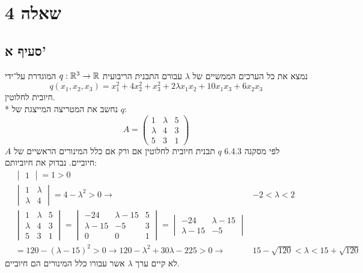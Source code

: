 \section{שאלה 4}
\subsection{סעיף א'}
נמצא את כל הערכים הממשיים של $\lambda$ עבורם התבנית הריבועית $q : \mathbb{R}^3 \to \mathbb{R}$ המוגדרת על־ידי
\[
	q(x_1, x_2, x_3) = x_1^2 + 4x_2^2 + x_3^2 + 2\lambda x_1 x_2 + 10x_1x_3 + 6x_2x_3
\]
חיובית לחלוטין. \\*
נחשב את המטריצה המייצגת של $q$:
\[
	A = \begin{pmatrix}
		1 & \lambda & 5 \\
		\lambda & 4 & 3 \\
		5 & 3 & 1
	\end{pmatrix}
\]
לפי מסקנה 6.4.3 $q$ תבנית חיובית לחלוטין אם ורק אם כלל המינורים הראשיים של $A$ חיוביים. נבדוק את חיוביותם:
\begin{align*}
	& \begin{vmatrix}
		1
	\end{vmatrix} = 1 > 0 \\
	& \begin{vmatrix}
		1 & \lambda \\
		\lambda & 4
	\end{vmatrix} = 4 - \lambda^2 > 0 \rightarrow
	& -2 < \lambda < 2 \\
	& \begin{vmatrix}
		1 & \lambda & 5 \\
		\lambda & 4 & 3 \\
		5 & 3 & 1
	\end{vmatrix}
	= \begin{vmatrix}
		-24 & \lambda - 15 & 5 \\
		\lambda - 15 & -5 & 3 \\
		0 & 0 & 1
	\end{vmatrix}
	= \begin{vmatrix}
		-24 & \lambda - 15 \\
		\lambda - 15 & -5
	\end{vmatrix} \\
	& = 120 - (\lambda - 15)^2 > 0
	\rightarrow 120 - \lambda^2 + 30 \lambda - 225 > 0
	\rightarrow & 15 - \sqrt{120} < \lambda < 15 + \sqrt{120}
\end{align*}
לא קיים ערך $\lambda$ אשר עבורו כלל המינורים הם חיוביים.

